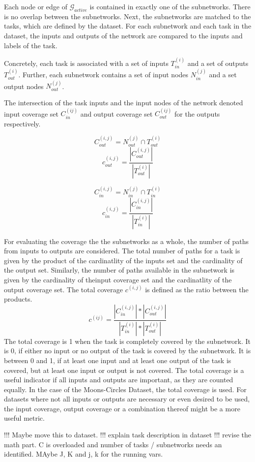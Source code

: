 Each node or edge of $\mathcal{G}_{active}$ is contained in exactly one of the subnetworks.
There is no overlap between the subnetworks.
Next, the subnetworks are matched to the tasks, which are defined by the dataset.
For each subnetwork and each task in the dataset, the inputs and outputs of the network are compared to the inputs and labels of the task.

Concretely, each task is associated with a set of inputs $T^{(i)}_{in}$ and a set of outputs $T^{(i)}_{out}$.
Further, each subnetwork contains a set of input nodes $N^{(j)}_{in}$ and a set output nodes $N^{(j)}_{out}$.

The intersection of the task inputs and the input nodes of the network denoted input coverage set $C^{(ij)}_{in}$ and output coverage set $C^{(ij)}_{out}$ for the outputs respectively.

$$
C^{(i,j)}_{out} = N^{(j)}_{out} \cap T^{(i)}_{out}
$$
$$
c^{(i,j)}_{out} = \frac{| C^{(i,j)}_{out} |}{|T^{(i)}_{out}|}
$$

$$
C^{(i,j)}_{in}  = N^{(j)}_{in}  \cap T^{(i)}_{in}
$$
$$
c^{(i,j)}_{in} = \frac{| C^{(i,j)}_{in} |}{|T^{(i)}_{in}|}
$$

For evaluating the coverage the the subnetworks as a whole, the number of paths from inputs to outputs are considered.
The total number of paths for a task is given by the product of the cardinatlity of the inputs set and the cardinality of the output set.
Similarly, the number of paths available in the subnetwork is given by the cardinality of theinput coverage set and the cardinatlity of the output coverage set.
The total coverage $c^{(i,j)}$ is defined as the ratio between the products.
$$
c^{(ij)} = \frac{
    | C^{(i,j)}_{in}| * | C^{(i,j)}_{out} |
    }{
    |T^{(i)}_{in}| * |T^{(i)}_{out}|
}
$$
The total coverage is 1 when the task is completely covered by the subnetwork.
It is 0, if either no input or no output of the task is covered by the subnetwork.
It is between 0 and 1, if at least one input and at least one output of the task is covered, but at least one input or output is not covered.
The total coverage is a useful indicator if all inputs and outputs are important, as they are counted equally.
In the case of the Moons-Circles Dataset, the total coverage is used.
For datasets where not all inputs or outputs are necessary or even desired to be used, the input coverage, output coverage or a combination thereof might be a more useful metric.

!!! Maybe move this to dataset.
!!! explain task description in dataset
!!! revise the math part. C is overloaded and number of tasks / subnetworks needs an identified. MAybe J, K and j, k for the running vars.

